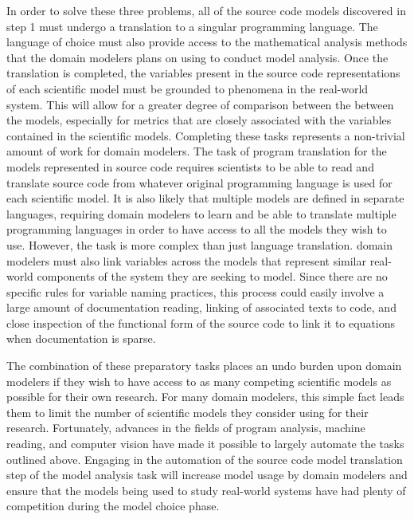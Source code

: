In order to solve these three problems, all of the source code models discovered in step 1 must undergo a translation to a singular programming language.
The language of choice must also provide access to the mathematical analysis methods that the domain modelers plans on using to conduct model analysis.
Once the translation is completed, the variables present in the source code representations of each scientific model must be grounded to phenomena in the real-world system.
This will allow for a greater degree of comparison between the between the models, especially for metrics that are closely associated with the variables contained in the scientific models.
Completing these tasks represents a non-trivial amount of work for domain modelers.
The task of program translation for the models represented in source code requires scientists to be able to read and translate source code from whatever original programming language is used for each scientific model.
It is also likely that multiple models are defined in separate languages, requiring domain modelers to learn and be able to translate multiple programming languages in order to have access to all the models they wish to use.
However, the task is more complex than just language translation.
domain modelers must also link variables across the models that represent similar real-world components of the system they are seeking to model.
Since there are no specific rules for variable naming practices, this process could easily involve a large amount of documentation reading, linking of associated texts to code, and close inspection of the functional form of the source code to link it to equations when documentation is sparse.

The combination of these preparatory tasks places an undo burden upon domain modelers if they wish to have access to as many competing scientific models as possible for their own research.
For many domain modelers, this simple fact leads them to limit the number of scientific models they consider using for their research.
Fortunately, advances in the fields of program analysis, machine reading, and computer vision have made it possible to largely automate the tasks outlined above.
Engaging in the automation of the source code model translation step of the model analysis task will increase model usage by domain modelers and ensure that the models being used to study real-world systems have had plenty of competition during the model choice phase.


